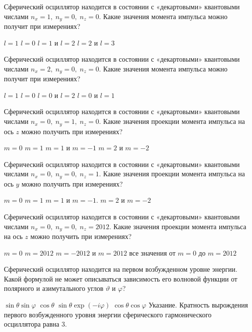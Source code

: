 \documentclass[11pt,a4paper]{exam}
\begin{document}
\begin{questions}
\question Сферический осциллятор находится в состоянии с «декартовыми» квантовыми числами ${n_x} = 1,\;{n_y} = 0,\;{n_z} = 0$. Какие значения момента импульса можно получит при измерениях? 
\begin{choices}
\choice $l = 1$     
\choice $l = 0$     
\choice $l = 1$ и $l = 2$    
\choice $l = 2$ и $l = 3$ 
\end{choices}

\question Сферический осциллятор находится в состоянии с «декартовыми» квантовыми числами ${n_x} = 2,\;{n_y} = 0,\;{n_z} = 0$. Какие значения момента импульса можно получит при измерениях? 
\begin{choices}
\choice $l = 1$     
\choice $l = 0$     
\choice $l = 0$ и $l = 2$    
\choice $l = 0$ и $l = 1$ 
\end{choices}

\question Сферический осциллятор находится в состоянии с «декартовыми» квантовыми числами ${n_x} = 0,\;{n_y} = 1,\;{n_z} = 0$. Какие значения проекции момента импульса на ось $z$ можно получить при измерениях? 
\begin{choices}
\choice $m = 0$     
\choice $m = 1$     
\choice $m = 1$ и $m =  - 1$       
\choice $m = 2$ и $m =  - 2$ 
\end{choices}

\question Сферический осциллятор находится в состоянии с «декартовыми» квантовыми числами ${n_x} = 0,\;{n_y} = 0,\;{n_z} = 1$. Какие значения проекции момента импульса на ось $y$ можно получить при измерениях? 
\begin{choices}
\choice $m = 0$     
\choice $m = 1$     
\choice $m = 1$ и $m =  - 1$.      
\choice $m = 2$ и $m =  - 2$ 
\end{choices}

\question Сферический осциллятор находится в состоянии с «декартовыми» квантовыми числами ${n_x} = 0,\;{n_y} = 0,\;{n_z} = 2012$. Какие значения проекции момента импульса на ось $z$ можно получить при измерениях? 
\begin{choices}
\choice $m = 0$           
\choice $m = 2012$
\choice $m =  - 2012$ и $m = 2012$    
\choice все значения от $m = 0$ до $m = 2012$ 
\end{choices}

\question Сферический осциллятор находится на первом возбужденном уровне энергии. Какой формулой не может описываться зависимость его волновой функции от полярного и азимутального углов $\vartheta $ и $\varphi $?
\begin{choices}
\choice $\sin \theta \sin \varphi $      
\choice $\cos \theta $    
\choice $\sin \theta $$\exp ( - i\varphi )$    
\choice $\cos \theta \cos \varphi $
Указание. Кратность вырождения первого возбужденного уровня энергии сферического гармонического осциллятора равна 3. 
\end{choices}


\end{questions}
\end{document}
